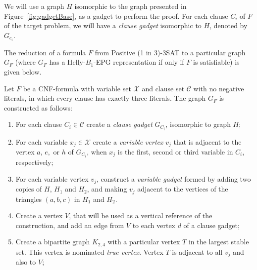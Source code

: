  
We will use a graph $H$ isomorphic to the graph presented in Figure~\ref{fig:gadgetBase}, as a gadget to perform the proof. For each clause $C_i$ of $F$ of the target problem, we will have a \emph{clause gadget} isomorphic to $H$, denoted by $G_{c_i}$.

 


The reduction of a formula $F$ from  {\sc Positive (1 in 3)-3SAT}  to a particular graph $G_F$ (where $G_F$ has a Helly-$B_1$-EPG representation if only if $F$ is satisfiable) is given below.

\begin{definition}\label{sec:reducao}
Let $F$ be a CNF-formula with variable set $\mathcal{X}$ and clause set $\mathcal{C}$ with no negative literals, in which every clause has exactly three literals. The graph $G_F$ is constructed as follows:

\begin{enumerate}
\item For each clause $C_i \in \mathcal{C}$ create a  \textit{clause gadget} $G_{C_i}$, isomorphic to  graph $H$;

\item For each variable $x_{j}\in \mathcal{X}$ create a \emph{variable vertex} $v_{j}$ that is adjacent to the vertex $a$, $e,$ or $h$ of $G_{C_i}$, when $x_{j}$ is the first, second or third variable in $C_i$, respectively;

\item For each variable vertex $v_{j}$, construct a \emph{variable gadget} formed by adding two copies of $H$, $H_1$ and $H_2$, and making $v_j$ adjacent to the vertices of the triangles $(a, b, c)$ in  $H_1$ and $H_2$.



\item Create a vertex $V$, that will be used as a vertical reference of the construction, and add an edge from $V$ to each vertex $d$ of a clause gadget;%

\item Create a bipartite graph $K_{2,4}$ with a particular vertex $T$ in the largest stable set. This vertex is nominated \emph{true vertex}. Vertex $T$ is adjacent to all $v_{j}$ and also to $V$;


\end{enumerate}
\end{definition}
